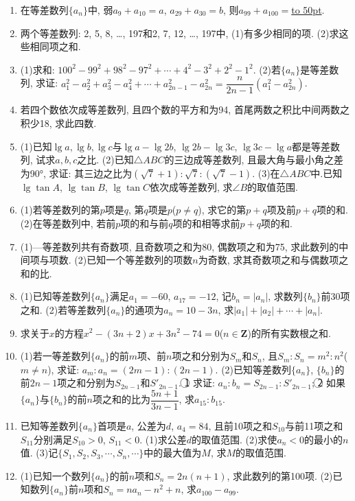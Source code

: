 \documentclass[10pt,a4paper]{article}
\newcommand{\blank}[1]{\underline{\hbox to #1pt{}}}
\begin{document}
\begin{enumerate}[1.]
\item 在等差数列$\{a_n\}$中, 弱$a_9+a_{10}=a$, $a_{29}+a_{30}=b$, 则$a_{99}+a_{100}=$\blank{50}.
\item 两个等差数列: 2, 5, 8, …, 197和2, 7, 12, …, 197中,
(1)有多少相同的项.						(2)求这些相同项之和.
\item (1)求和: $100^2-99^2+98^2-97^2+\cdots +4^2-3^2+2^2-1^2$.
(2)若$\{a_n\}$是等差数列, 求证: $a_1^2-a_2^2+a_3^2-a_4^2+\cdots +a_{2n-1}^2-a_{2n}^2=\dfrac n{2n-1}(a_1^2-a_{2n}^2)$.
\item 若四个数依次成等差数列, 且四个数的平方和为94, 首尾两数之积比中间两数之积少18, 求此四数.
\item (1)已知$\lg a,\lg b,\lg c$与$\lg a-\lg 2b$, $\lg 2b-\lg 3c$, $\lg 3c-\lg a$都是等差数列, 试求$a,b,c$之比.
(2)已知$\triangle ABC$的三边成等差数列, 且最大角与最小角之差为90°, 求证: 其三边之比为$(\sqrt 7+1):\sqrt 7:(\sqrt 7-1)$.
(3)在$\triangle ABC$中.已知$\lg \tan A$, $\lg \tan B$, $\lg \tan C$依次成等差数列, 求$\angle B$的取值范围.
\item (1)若等差数列的第$p$项是$q$, 第$q$项是$p$($p\ne q$), 求它的第$p+q$项及前$p+q$项的和.
(2)在等差数列中, 若前$p$项的和与前$q$项的和相等求前$p+q$项的和.
\item (1)—等差数列共有奇数项, 且奇数项之和为80, 偶数项之和为75, 求此数列的中间项与项数.
(2)已知一个等差数列的项数$n$为奇数, 求其奇数项之和与偶数项之和的比.
\item (1)已知等差数列$\{a_n\}$满足$a_1=-60$, $a_{17}=-12$, 记$b_n=|a_n|$, 求数列$\{b_n\}$前30项之和.
(2)若等差数列$\{a_n\}$的通项为$a_n=10-3n$, 求$|a_1|+|a_2|+\cdots +|a_n|$.
\item 求关于$x$的方程$x^2-(3n+2)x+3n^2-74=0$($n\in \mathbf{Z}$)的所有实数根之和.
\item (1)若一等差数列$\{a_n\}$的前$m$项、前$n$项之和分别为$S_m$和$S_n$, 且$S_m:S_n=m^2:n^2$($m\ne n$), 求证: $a_m:a_n=(2m-1):(2n-1)$.
(2)已知等差数列$\{a_n\}$, $\{b_n\}$的前$2n-1$项之和分别为$S_{2n-1}$和$S'_{2n-1}$.
\textcircled{1} 求证: $a_n:b_n=S_{2n-1}:S'_{2n-1}$;
\textcircled{2} 如果$\{a_n\}$与$\{b_n\}$的前$n$项之和的比为$\dfrac{5n+1}{3n-1}$, 求$a_{15}:b_{15}$.
\item 已知等差数列$\{a_n\}$首项是$a$, 公差为$d$, $a_4=84$, 且前10项之和$S_{10}$与前11项之和$S_{11}$分别满足$S_{10}>0$, $S_{11}<0$.
(1)求公差$d$的取值范围.
(2)求使$a_n<0$的最小的$n$值.
(3)记$\{S_1,S_2,S_3,\cdots ,S_n,\cdots\}$中的最大值为$M$, 求$M$的取值范围.
\item (1)已知一个数列$\{a_n\}$的前$n$项和$S_n=2n(n+1)$, 求此数列的第100项.
(2)已知数列$\{a_n\}$前$n$项和$S_n=na_n-n^2+n$, 求$a_{100}-a_{99}$.

\end{enumerate}
\end{document}
